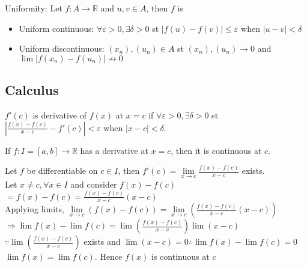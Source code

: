 \documentclass{article}
\begin{document}
Uniformity: Let $f: A \rightarrow \mathbb{R}$ and $u,v \in A$, then $f$ is 
\begin{itemize}
	\item Uniform continuous: $\forall \varepsilon > 0, \exists \delta > 0$ st $|f(u) - f(v)| \leq \varepsilon$ when $|u-v|<\delta$
	\item Uniform discontinuous: $(x_n), (u_n) \in A$ st $(x_n), (u_n) \rightarrow 0$ and $\lim |f(x_n) - f(u_n)| \not\rightarrow 0$
\end{itemize}
 
 \subsection{Calculus}

$f'(c)$ is derivative of $f(x)$ at $x=c$ if $\forall \varepsilon > 0, \exists \delta > 0$ st $\left|\frac{f(x)-f(c)}{x-c} - f'(c) \right|< \varepsilon$ when $|x-c| < \delta$.

If $f: I = [a,b] \rightarrow \mathbb{R}$ has a derivative at $x=c$, then it is continuous at $c$.
\begin{tcolorbox}[colback=lightgray!10,colframe=lightgray!10, fontupper=\linespread{2}\selectfont]
	Let $f$ be differentiable on $c \in I$, then $f'(c) = \lim\limits_{x \rightarrow c} \frac{f(x) - f(c)}{x-c}$ exists. \\	
	Let $x \not= c, \forall x \in I$ and consider $f(x) - f(c)$ \\
	$= f(x) - f(c) = \frac{f(x)-f(c)}{x-c}(x-c)$ \\	
	Applying limits, $\lim\limits_{x\rightarrow c} (f(x) - f(c)) = \lim\limits_{x\rightarrow c} (\frac{f(x)-f(c)}{x-c}(x-c))$ \\	
	$\Rightarrow \lim f(x) - \lim f(c) = \lim (\frac{f(x)-f(c)}{x-c}) \lim (x-c)$ \\
	$\because \lim (\frac{f(x)-f(c)}{x-c})$ exists and $\lim (x-c) = 0 \therefore \lim f(x) - \lim f(c) = 0$ \\
	$\lim f(x) = \lim f(c)$.
	Hence $f(x)$ is continuous at $c$
\end{tcolorbox}
\end{document}
